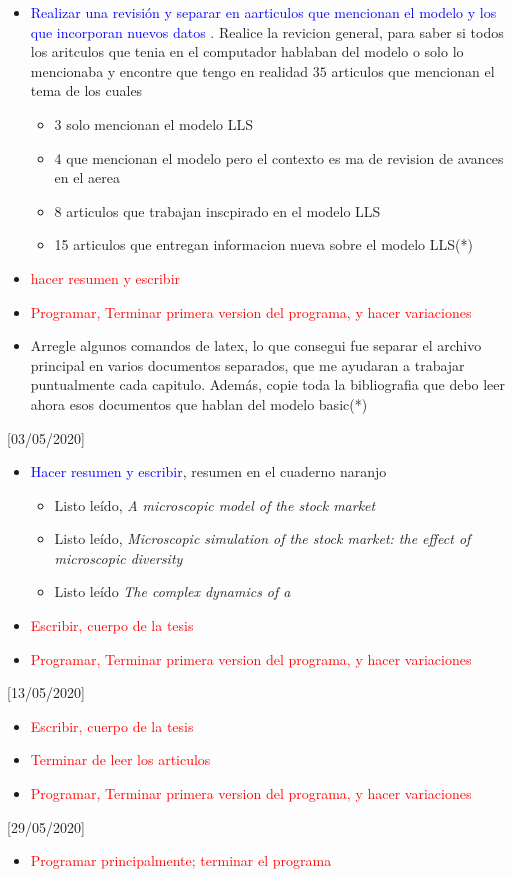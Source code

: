 \documentclass[a4paper,14pt]{article}
\begin{document}
\begin{itemize}
\item \textcolor{blue}{Realizar una revisión y separar en aarticulos que mencionan el modelo y los que incorporan nuevos datos }. Realice la revicion general, para saber si todos los aritculos que tenia en el computador hablaban del modelo o solo lo mencionaba y encontre que tengo en realidad $35$ articulos que mencionan el tema de los cuales 
\begin{itemize}
\item 3 solo mencionan el modelo LLS
\item 4 que mencionan el modelo pero el contexto es ma de revision de avances en el aerea
\item 8 articulos que trabajan inscpirado en el modelo LLS
\item 15 articulos que entregan informacion nueva sobre el modelo LLS(*)
\end{itemize}
\item \textcolor{red}{hacer resumen y escribir}
\item \textcolor{red}{Programar, Terminar primera version del programa, y hacer variaciones}
\item Arregle algunos comandos de latex, lo que consegui fue separar el archivo principal en varios documentos separados, que me ayudaran a trabajar puntualmente cada capitulo. Además, copie toda la bibliografia que debo leer ahora esos documentos que hablan del modelo basic(*)
\end{itemize}
[03/05/2020]
\begin{itemize}
\item \textcolor{blue}{Hacer resumen y escribir}, resumen en el cuaderno naranjo
\begin{itemize}
\item Listo leído, \textit{A microscopic model of the stock market}
\item Listo leído, \textit{Microscopic simulation of the stock market: the effect of microscopic diversity}
\item Listo leído \textit{The complex dynamics of a}
\end{itemize}
\item \textcolor{red}{Escribir, cuerpo de la tesis }
\item \textcolor{red}{Programar, Terminar primera version del programa, y hacer variaciones}
\end{itemize}
[13/05/2020]
\begin{itemize}\item \textcolor{red}{Escribir, cuerpo de la tesis }
\item \textcolor{red}{Terminar de leer los articulos}
\item \textcolor{red}{Programar, Terminar primera version del programa, y hacer variaciones}
\end{itemize}
[29/05/2020]
\begin{itemize}
\item \textcolor{red}{Programar principalmente; terminar el programa}
\end{itemize}
\end{document}
